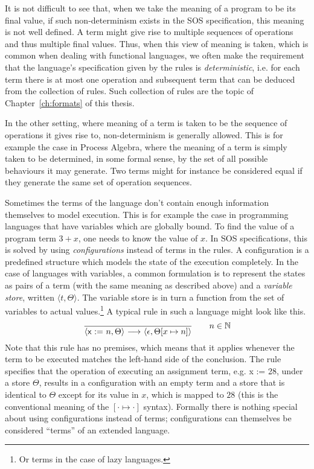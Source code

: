 It is not difficult to see that, when we take the meaning of a program to be its
final value, if such non-determinism exists in the SOS specification, this meaning
is not well defined. A term might give rise to multiple sequences of operations and
thus multiple final values. Thus, when this view of meaning is taken, which is
common when dealing with functional languages, we often make the requirement that
the language's specification given by the rules is \emph{deterministic}, 
i.e. for each term
there is at most one operation and subsequent term that can be deduced from the
collection of rules. Such collection of rules are the topic of Chapter~\ref{ch:formats}
of this thesis.

In the other setting, where meaning of a term is taken to be the sequence of
operations it gives rise to, non-determinism is generally allowed. This is for example
the case in Process Algebra, where the meaning of a term is simply taken to be
determined, in some formal sense, by
the set of all possible behaviours it may generate. Two terms might for instance be considered
equal if they generate the same set of operation sequences.

\vspace{1em}

Sometimes the terms of the language don't contain enough information themselves
to model execution. This is for example the case in programming languages that have
variables which are globally bound. To find the value of a program term $3 + x$,
one needs to know the value of $x$. In SOS specifications, this is solved by using
\emph{configurations} instead of terms in the rules. A configuration is a predefined
structure which models the state of the execution completely. In the case of languages
with variables, a common formulation is to represent the states as pairs of a
term (with the same meaning as described above) and a \emph{variable store}, written
$\langle t, \Theta \rangle$. The variable store is in turn a function from the
set of variables to actual values.\footnote{Or terms in the case of lazy languages.}
A typical rule in such a language might look like this.
\begin{equation}\label{eq:intro_rule3}
    \frac{}{\langle \textsf{x := }n, \Theta\rangle \ {\stackrel{{}}{\longrightarrow}}\ 
            \langle \epsilon, \Theta[x\mapsto n]\rangle} \qquad n\in \mathbb{N}
\end{equation}
Note that this rule has no premises, which means that it applies whenever the term
to be executed matches the left-hand side of the conclusion.
The rule specifies that the operation of executing an assignment term, e.g.
\textsf{x := 28}, under a store $\Theta$, results in a configuration with an
empty term and a store that is identical to $\Theta$ except for its value in $x$,
which is mapped to $28$ (this is the conventional meaning of the $[\cdot\mapsto\cdot]$ syntax).
Formally there is nothing special about using configurations instead of terms;
configurations can themselves be considered ``terms'' of an extended language.

